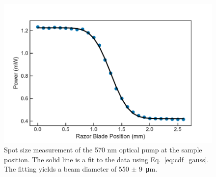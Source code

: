 \begin{figure}[h]
	\centering
	\includegraphics[scale=0.65]{images/chapter_methods/pump_spot_size}
	\caption{Spot size measurement of the 570 nm optical pump at the sample position. The solid line is a fit to the data using Eq.\ \ref{eq:cdf_gauss}. The fitting yields a beam diameter of 550 $\pm$ \SI{9}{\micro\meter}.}
\end{figure}
